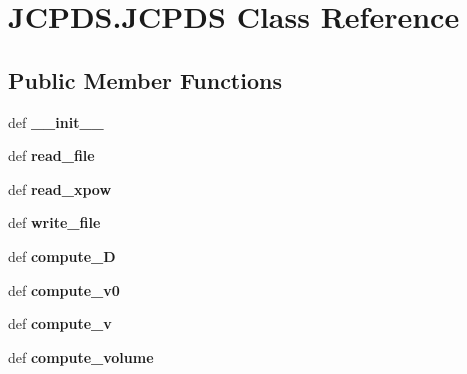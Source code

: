 \hypertarget{classJCPDS_1_1JCPDS}{\section{J\-C\-P\-D\-S.\-J\-C\-P\-D\-S Class Reference}
\label{classJCPDS_1_1JCPDS}
}
\subsection*{Public Member Functions}
\begin{DoxyCompactItemize}
\item 
\hypertarget{classJCPDS_1_1JCPDS_aca0207da67855730a22a3bbcd031c1d3}{def {\bfseries \-\_\-\-\_\-init\-\_\-\-\_\-}}\label{classJCPDS_1_1JCPDS_aca0207da67855730a22a3bbcd031c1d3}

\item 
\hypertarget{classJCPDS_1_1JCPDS_ab3335931a8dbbff1bff32de39d752723}{def {\bfseries read\-\_\-file}}\label{classJCPDS_1_1JCPDS_ab3335931a8dbbff1bff32de39d752723}

\item 
\hypertarget{classJCPDS_1_1JCPDS_a728290518d30c0c2df73cf1383515768}{def {\bfseries read\-\_\-xpow}}\label{classJCPDS_1_1JCPDS_a728290518d30c0c2df73cf1383515768}

\item 
\hypertarget{classJCPDS_1_1JCPDS_a229ed071c04b6cb367ea7b349539e711}{def {\bfseries write\-\_\-file}}\label{classJCPDS_1_1JCPDS_a229ed071c04b6cb367ea7b349539e711}

\item 
\hypertarget{classJCPDS_1_1JCPDS_a9bce7cbc5045239ca4175d750256e6aa}{def {\bfseries compute\-\_\-\-D}}\label{classJCPDS_1_1JCPDS_a9bce7cbc5045239ca4175d750256e6aa}

\item 
\hypertarget{classJCPDS_1_1JCPDS_a3d9ee706776a7e24826e8a21ac8ac51a}{def {\bfseries compute\-\_\-v0}}\label{classJCPDS_1_1JCPDS_a3d9ee706776a7e24826e8a21ac8ac51a}

\item 
\hypertarget{classJCPDS_1_1JCPDS_a15973313ee7187e0e0bef03b1aebed0e}{def {\bfseries compute\-\_\-v}}\label{classJCPDS_1_1JCPDS_a15973313ee7187e0e0bef03b1aebed0e}

\item 
\hypertarget{classJCPDS_1_1JCPDS_aa837bef35e9c46e89a6c2673dfaa10b8}{def {\bfseries compute\-\_\-volume}}\label{classJCPDS_1_1JCPDS_aa837bef35e9c46e89a6c2673dfaa10b8}


\end{DoxyCompactItemize}

